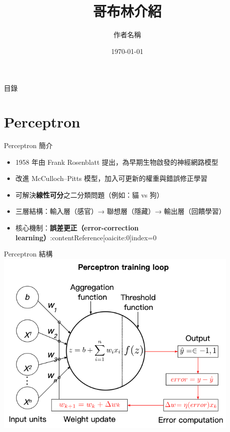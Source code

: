 \documentclass{beamer}
\title{哥布林介紹}
\author{作者名稱}
\date{\today}
\begin{document}
\begin{frame}
    \titlepage
\end{frame}

\begin{frame}{目錄}
    \tableofcontents
\end{frame}

\section{Perceptron}
\begin{frame}{Perceptron 簡介}
\begin{itemize}
  \item 1958 年由 Frank Rosenblatt 提出，為早期生物啟發的神經網路模型  
  \item 改進 McCulloch–Pitts 模型，加入\alert{可更新的權重}與\alert{錯誤修正學習}  
  \item 可解決\textbf{線性可分}之二分類問題（例如：貓 vs 狗）  
  \item 三層結構：輸入層（感官）→ 聯想層（隱藏）→ 輸出層（回饋學習）  
  \item 核心機制：\textbf{誤差更正（error-correction learning）}:contentReference[oaicite:0]{index=0}
\end{itemize}
\end{frame}

\begin{frame}{Perceptron 結構}
  \centering
  \includegraphics[width=0.9\textwidth]{perceptron_pic.png}
  \vspace{0.5em}
\end{frame}
\end{document}
